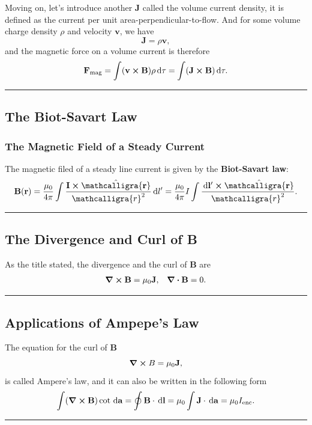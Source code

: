 \documentclass[12pt,english]{article}
\newcommand{\dmr}[1]{\, \mathrm{d}#1} %
\numberwithin{equation}{subsection}
\newcommand{\curly}[1]{\ensuremath{\mathcalligra{#1}}}
\let\oldhat\hat
\renewcommand{\vec}[1]{\mathbf{#1}}
\renewcommand{\hat}[1]{\oldhat{\mathbf{#1}}}
\begin{document}
Moving on, let's introduce another $\vec{J}$ called the volume current density, it is defined as the current per unit area-perpendicular-to-flow. And for some volume charge density $\rho$ and velocity $\vec{v}$, we have
\begin{equation}
    \vec{J} = \rho \vec{v},
\end{equation}
and the magnetic force on a volume current is therefore
\begin{equation}
    \vec{F}_{\text{mag}} = \int (\vec{v}\cross\vec{B})\rho \dmr{\tau} = \int (\vec{J}\cross \vec{B})\dmr{\tau}.
\end{equation}
\par\noindent\rule{\textwidth}{0.4pt}
\subsection{The Biot-Savart Law}
\subsubsection{The Magnetic Field of a Steady Current}
The magnetic filed of a steady line current is given by the \textbf{Biot-Savart law}:
\begin{equation}
    \vec{B}(\vec{r}) = \frac{\mu_0}{4\pi}\int\frac{\vec{I}\cross\hat{\curly{r}}}{\curly{r}^2}\dmr{l'} = \frac{\mu_0}{4\pi}I\int \frac{\dmr{\vec{l'}}\cross\hat{\curly{r}}}{\curly{r}^2}.
\end{equation}
\par\noindent\rule{\textwidth}{0.4pt}

\subsection{The Divergence and Curl of B}
As the title stated, the divergence and the curl of $\vec{B}$ are
\begin{align*}
    \curl\vec{B} = \mu_0 \vec{J}, && \divergence \vec{B} =0.
\end{align*}


\par\noindent\rule{\textwidth}{0.4pt}
\subsection{Applications of Ampepe's Law}
The equation for the curl of $\vec{B}$
\begin{equation}
    \curl B = \mu_0 \vec{J},
\end{equation}
is called Ampere's law, and it can also be written in the following form
\begin{equation}
    \int(\curl\vec{B})\cot\dmr{\vec{a}} = \oint \vec{B} \cdot \dmr{\vec{l}} = \mu_0 \int \vec{J} \cdot \dmr{\vec{a}} = \mu_0 I_{\text{enc}}.
\end{equation}
\par\noindent\rule{\textwidth}{0.4pt}
\end{document}
